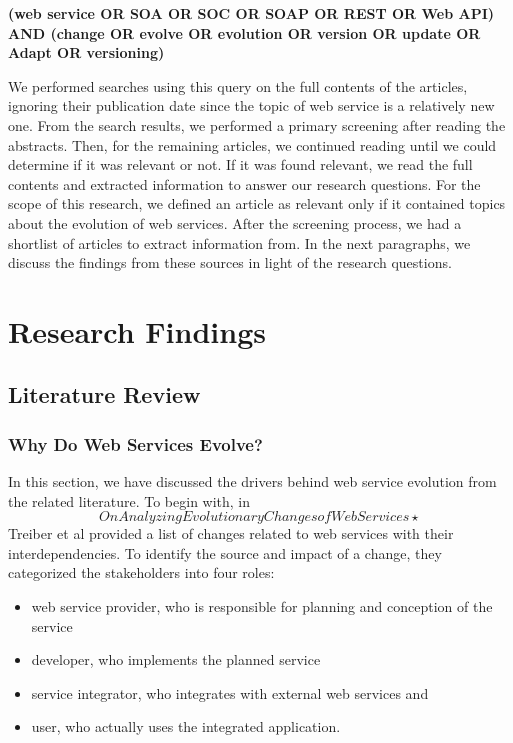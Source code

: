 \documentclass[runningheads,a4paper]{llncs}
\begin{document}
\textbf{(web service OR SOA OR SOC OR SOAP OR REST OR Web API)  AND (change OR evolve OR evolution OR version OR update OR Adapt OR versioning)}

We performed searches using this query on the full contents of the articles, ignoring their publication date since the topic of web service is a relatively new one. From the search results, we performed a primary screening after reading the abstracts. Then, for the remaining articles, we continued reading until we could determine if it was relevant or not. If it was found relevant, we read the full contents and extracted information to answer our research questions. For the scope of this research, we defined an article as relevant only if it contained topics about the evolution of web services. After the screening process, we had a shortlist of articles to extract information from. In the next paragraphs, we discuss the findings from these sources in light of the research questions.


\section{Research Findings} %
\label{sec:research_findings}

\subsection{Literature Review} %
\label{sub:literature_review}

\subsubsection{Why Do Web Services Evolve?} %
\label{sub:why_do_web_services_change}
In this section, we have discussed the drivers behind web service evolution from the related literature. To begin with, in \[On Analyzing Evolutionary Changes of Web Services⋆\] Treiber et al provided a list of changes related to web services with their interdependencies. To identify the source and impact of a change, they categorized the stakeholders into four roles:

\begin{itemize}
  \item web service provider, who is responsible for planning and conception of the service
  \item developer, who implements the planned service
  \item service integrator, who integrates with external web services and
  \item user, who actually uses the integrated application.
\end{itemize}
\end{document}

